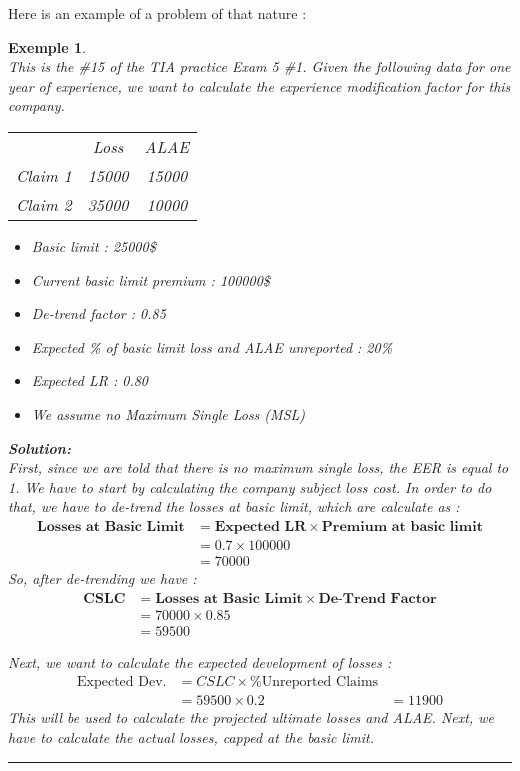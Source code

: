 \documentclass[11pt, english]{memoir}
\numberwithin{definition}{section}
\newtheorem{example}{Exemple}[section]
\newenvironment{exemple}
{
	\begin{example} \normalfont \ \\[5pt] 
	}
	{
		\hfill\rule{0.5em}{0.5em}\end{example}
}
\newenvironment{solution}
{\noindent\textbf{Solution:} \\[5pt] 
}{
}
\begin{document}
Here is an example of a problem of that nature :
\begin{exemple}
	This is the \#15 of the TIA practice Exam 5 \#1. Given the following data for one year of experience, we want to calculate the experience modification factor for this company. 
	\begin{center}
		\begin{tabular}{ccc}
			& Loss & ALAE\\
			Claim 1 &15000 & 15000\\
			Claim 2 &35000 & 10000
		\end{tabular}
	\end{center}

	\begin{itemize}
		\item Basic limit : 25000\$
		\item Current basic limit premium : 100000\$
		\item De-trend factor : 0.85
		\item Expected \% of basic limit loss and ALAE unreported : 20\%
		\item Expected LR : 0.80
		\item We assume no Maximum Single Loss (MSL)
	\end{itemize}

\begin{solution}
	First, since we are told that there is no maximum single loss, the EER is equal to 1. We have to start by calculating the company subject loss cost. In order to do that, we have to de-trend the losses at basic limit, which are calculate as : 
	\begin{align*}
	\textbf{Losses at Basic Limit} &= \textbf{Expected LR} \times \textbf{Premium at basic limit}\\
	&= 0.7 \times 100 000\\
	&= 70 000
	\end{align*}
	So, after de-trending we have : 
	\begin{align*}
	\mathbf{CSLC} &= \textbf{Losses at Basic Limit} \times \textbf{De-Trend Factor}\\
	&= 70000 \times 0.85\\
	&= 59500
	\end{align*}
	
	Next, we want to calculate the expected development of losses : 
	\begin{align*}
	\text{Expected Dev.} &= CSLC \times \text{\% Unreported Claims}\\
	&= 59500\times 0.2
	&= 11900
	\end{align*}
	This will be used to calculate the projected ultimate losses and ALAE. Next, we have to calculate the actual losses, capped at the basic limit. 
	

\end{solution}
\end{exemple}
\end{document}
